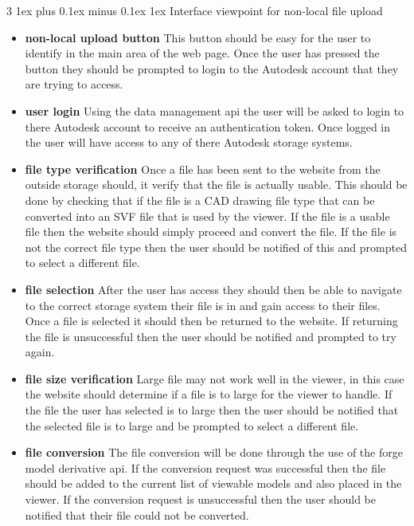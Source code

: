 \documentclass[letterpaper, 10pt, draftclsnofoot, compsoc, onecolumn]{IEEEtran}
\makeatletter
\def\subsubsection{\@startsection{subsubsection}%
                                 {3}%
                                 {\z@}%
                                 {1ex plus 0.1ex minus 0.1ex}%
                                 {1ex}%
                                 {\normalfont\normalsize}}%
\makeatother
\begin{document}
\subsubsection{Interface viewpoint for non-local file upload}
\begin{itemize}
	\item[]\textbf{non-local upload button} This button should be easy for the user to identify in the main area of the web page. Once the user has pressed the button they should be prompted to login to the Autodesk account that they are trying to access.
	\item[]\textbf{user login} Using the data management api the user will be asked to login to there Autodesk account to receive an authentication token. Once logged in the user will have access to any of there Autodesk storage systems. 
	\item[]\textbf{file type verification} Once a file has been sent to the website from the outside storage should, it verify that the file is actually usable. This should be done by checking that if the file is a CAD drawing file type that can be converted into an SVF file that is used by the viewer. If the file is a usable file then the 	
	website should simply proceed and convert the file. If the file is not the correct file type then the user should be notified of this and prompted to select a different file.  
	\item[]\textbf{file selection} After the user has access they should then be able to navigate to the correct storage system their file is in and gain access to their files. Once a file is selected it should then be returned to the website. If returning the file is unsuccessful then the user should be notified and prompted to try 
	again.
	\item[]\textbf{file size verification} Large file may not work well in the viewer, in this case the website should determine if a file is to large for the viewer to handle. If the file the user has selected is to large then the user should be 		
	notified that the selected file is to large and be prompted to select a different file.
	\item[]\textbf{file conversion} The file conversion will be done through the use of the forge model derivative api. If the conversion request was successful then the file should be added to the current list of viewable models and also placed in the viewer. If the conversion request is unsuccessful then the user should
	 be notified that their file could not be converted. 
\end{itemize}
  
\end{document}
